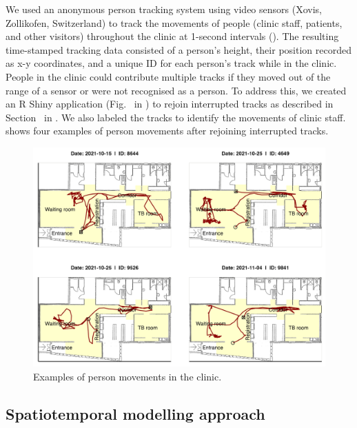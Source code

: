 \documentclass[fleqn,11pt]{wlscirep}
\begin{document}
We used an anonymous person tracking system using video sensors (Xovis, Zollikofen, Switzerland) to track the movements of people (clinic staff, patients, and other visitors) throughout the clinic at 1-second intervals (). The resulting time-stamped tracking data consisted of a person’s height, their position recorded as x-y coordinates, and a unique ID for each person's track while in the clinic. People in the clinic could contribute multiple tracks if they moved out of the range of a sensor or were not recognised as a person. To address this, we created an R Shiny application (Fig.~ in \supp) to rejoin interrupted tracks as described in Section~ in \supp. We also labeled the tracks to identify the movements of clinic staff.  shows four examples of person movements after rejoining interrupted tracks.  

\begin{figure}[!htpb]
    \centering
    \includegraphics{results/data/example-patient-tracks.png}
    \caption{Examples of person movements in the clinic.}
    \label{fig:tracking-examples}
\end{figure}


\subsection*{Spatiotemporal modelling approach}
\end{document}

